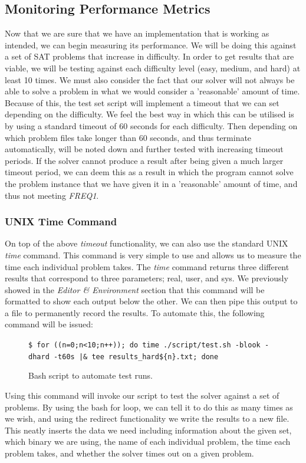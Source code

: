 \documentclass{article}
\begin{document}
\subsection{Monitoring Performance Metrics}
Now that we are sure that we have an implementation that is working as intended, we can begin measuring its performance. We will 
be doing this against a set of SAT problems that increase in difficulty. In order to get results that are viable, we will be 
testing against each difficulty level (easy, medium, and hard) at least 10 times. We must also consider the fact that our solver 
will not always be able to solve a problem in what we would consider a 'reasonable' amount of time. Because of this, the test set 
script will implement a timeout that we can set depending on the difficulty. We feel the best way in which this can be utilised 
is by using a standard timeout of 60 seconds for each difficulty. Then depending on which problem files take longer than 60 
seconds, and thus terminate automatically, will be noted down and further tested with increasing timeout periods. If the solver 
cannot produce a result after being given a much larger timeout period, we can deem this as a result in which the program cannot 
solve the problem instance that we have given it in a 'reasonable' amount of time, and thus not meeting \textit{FREQ1}.

\subsubsection{UNIX Time Command}
On top of the above \textit{timeout} functionality, we can also use the standard UNIX \textit{time} command. This command is very 
simple to use and allows us to measure the time each individual problem takes. The \textit{time} command returns three different 
results that correspond to three parameters; real, user, and sys. We previously showed in the \textit{Editor \& Environment} 
section that this command will be formatted to show each output below the other. We can then pipe this output to a file to 
permanently record the results. To automate this, the following command will be issued:

\begin{figure}[h]
    \centering
    \texttt{\$ for ((n=0;n<10;n++)); do time ./script/test.sh -blook -dhard -t60s |\& tee results\_hard\$\{n\}.txt; done}
    \caption{Bash script to automate test runs.}
\end{figure}

Using this command will invoke our script to test the solver against a set of problems. By using the bash for loop, we can tell
it to do this as many times as we wish, and using the redirect functionality we write the results to a new file. This neatly
inserts the data we need including information about the given set, which binary we are using, the name of each individual
problem, the time each problem takes, and whether the solver times out on a given problem. 
\end{document}
